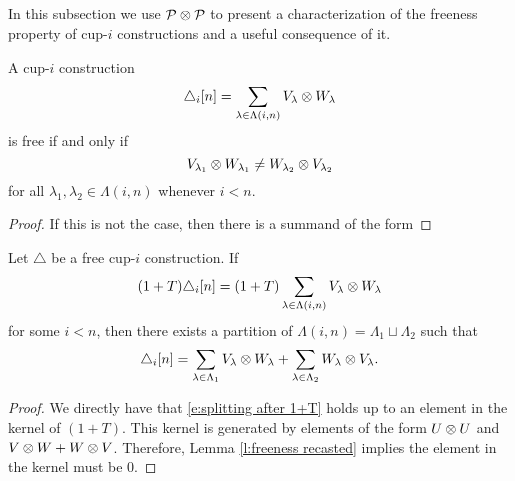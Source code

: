 \subsection{}

In this subsection we use $\mathcal{P} \otimes \mathcal{P}$ to present a characterization of the freeness property of cup-$i$ constructions and a useful consequence of it.

\begin{lemma} \label{l:freeness recasted}
	A cup-$i$ construction
	\[
	\triangle_i [n] = \sum_{\lambda \in \Lambda(i,n)} {V_\lambda} \otimes {W_\lambda}
	\]
	is free if and only if
	\[
	{V_{\lambda_1}} \otimes {W_{\lambda_1}} \neq
	{W_{\lambda_2}} \otimes {V_{\lambda_2}}
	\]
	for all $\lambda_1, \lambda_2 \in \Lambda(i,n)$ whenever $i < n$.
\end{lemma}

\begin{proof}
	If this is not the case, then there is a summand of the form
\end{proof}

\begin{lemma} \label{l:(1+T) triangle = 0 implies triangle = 0}
    Let $\triangle$ be a free cup-$i$ construction.
    If
    \[
    (1+T) \triangle_i [n] =
    (1+T) \sum_{\lambda \in \Lambda(i,n)} {V_\lambda} \otimes {W_\lambda}
    \]
    for some $i < n$, then there exists a partition of $\Lambda(i,n) = \Lambda_1 \sqcup \Lambda_2$ such that
    \begin{equation} \label{e:splitting after 1+T}
    \triangle_i [n] =
    \sum_{\lambda \in \Lambda_1} {V_\lambda} \otimes {W_\lambda} +
    \sum_{\lambda \in \Lambda_2} {W_\lambda} \otimes {V_\lambda}.
    \end{equation}
\end{lemma}

\begin{proof}
	We directly have that \eqref{e:splitting after 1+T} holds up to an element in the kernel of $(1+T)$.
	This kernel is generated by elements of the form $U \otimes U$ and $V \otimes W + W \otimes V$.
	Therefore, Lemma \ref{l:freeness recasted} implies the element in the kernel must be $0$.
\end{proof}